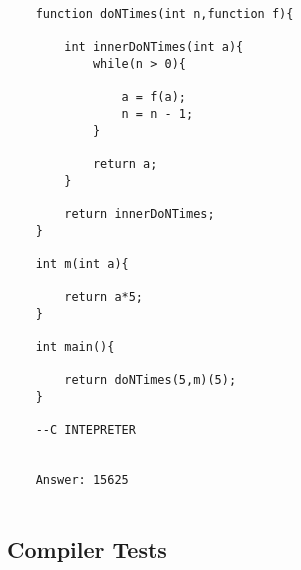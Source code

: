 \documentclass{article}
\begin{document}
	\begin{lstlisting}
	function doNTimes(int n,function f){
		
		int innerDoNTimes(int a){
			while(n > 0){
				
				a = f(a);
				n = n - 1;
			}
			
			return a;
		}
		
		return innerDoNTimes;
	}
	
	int m(int a){
		
		return a*5;
	}
	
	int main(){
		
		return doNTimes(5,m)(5);
	}
	
	--C INTEPRETER
	
	
	Answer: 15625
	
	\end{lstlisting}
	
	\subsection{Compiler Tests}
	
\end{document}
